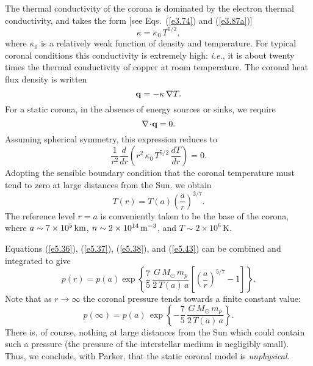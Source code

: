 The thermal conductivity of the corona is dominated by the electron thermal
conductivity, and takes the form [see Eqs.~(\ref{e3.74}) and (\ref{e3.87a})]
\begin{equation}
\kappa = \kappa_0\,T^{5/2},
\end{equation}
where $\kappa_0$ is a relatively weak function of density and
temperature. For typical coronal conditions this conductivity is
extremely high: {\em i.e.}, it is about twenty times the thermal
conductivity of copper at room temperature. The coronal heat flux density
is written
\begin{equation}
{\bf q} = - \kappa\,\nabla T.
\end{equation}
For a static corona, in the absence of energy sources or sinks, we require
\begin{equation}
\nabla\!\cdot\!{\bf q} = 0.
\end{equation}
Assuming spherical symmetry, this expression reduces to
\begin{equation}
\frac{1}{r^2}\frac{d}{dr}\!\left(r^2\,\kappa_0\,T^{5/2}\,\frac{dT}{dr}\right) =0.
\end{equation}
Adopting the sensible boundary condition that the coronal temperature must
tend to zero at large distances from the Sun, we obtain
\begin{equation}\label{e5.43}
T(r) = T(a)\left(\frac{a}{r}\right)^{2/7}.
\end{equation}
The reference level $r=a$ is conveniently taken to be the
base of the corona, where $a\sim 7\times 10^5\,{\rm km}$, $n\sim
2\times 10^{14}\,{\rm m}^{-3}$, and $T\sim 2\times 10^{6}$\,K. 

Equations (\ref{e5.36}), (\ref{e5.37}), (\ref{e5.38}), and (\ref{e5.43}) can be combined and
integrated to give
\begin{equation}
p(r) = p(a) \exp\left\{\frac{7}{5}\,\frac{G\,M_\odot\,m_p}{2\,T(a)\,a}
\left[\left(\frac{a}{r}\right)^{5/7}-1\right]\right\}.
\end{equation}
Note that as $r\rightarrow\infty$ the coronal pressure tends towards a finite
constant value:
\begin{equation}
p(\infty) = p(a)\,\exp\left\{-\frac{7}{5}\,\frac{G\,M_\odot\,m_p}{2\,T(a)\,a}
\right\}.
\end{equation}
There is, of course, nothing at large distances from the Sun which could
contain such a pressure (the pressure of the interstellar medium is
negligibly small). Thus, we conclude, with Parker, that the
static coronal model is {\em unphysical}. 

